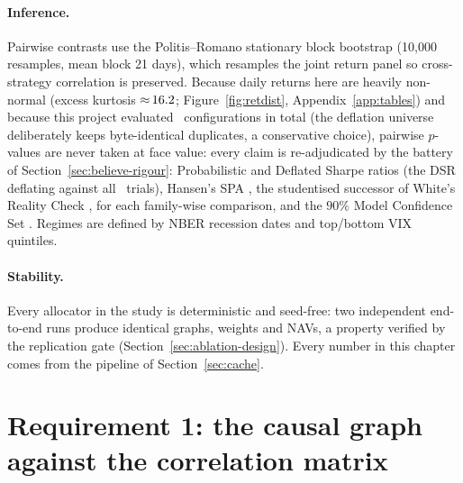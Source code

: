 \paragraph{Inference.} Pairwise contrasts use the Politis--Romano stationary
block bootstrap \cite{politis1994stationary} (10{,}000 resamples, mean
block 21
days), which resamples the joint return panel so cross-strategy correlation
is preserved. Because daily returns here are heavily non-normal (excess
kurtosis ${\approx}\,16.2$; Figure~\ref{fig:retdist},
Appendix~\ref{app:tables}) and because this
project evaluated \rsNtrials\ configurations in total (the deflation
universe deliberately keeps byte-identical duplicates, a conservative
choice), pairwise
$p$-values are never taken at face value: every claim is re-adjudicated by
the battery of Section~\ref{sec:believe-rigour}: Probabilistic and
Deflated Sharpe ratios \cite{bailey2012psr,bailey2014deflated} (the DSR
deflating against all \rsNtrials\ trials), Hansen's SPA
\cite{hansen2005spa}, the studentised successor of White's Reality
Check \cite{white2000reality}, for each
family-wise comparison, and the $90\%$ Model Confidence Set
\cite{hansen2011mcs}. Regimes are defined by NBER recession dates and
top/bottom VIX quintiles.

\paragraph{Stability.} Every allocator in the study is deterministic and
seed-free: two independent end-to-end runs produce identical graphs,
weights and NAVs, a property verified by the replication gate
(Section~\ref{sec:ablation-design}). Every number in this chapter comes
from the pipeline of Section~\ref{sec:cache}.

\section{Requirement 1: the causal graph against the correlation matrix}
\label{sec:r1}

